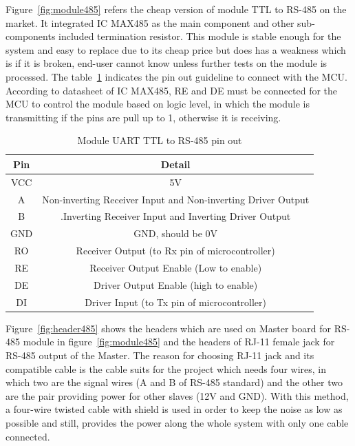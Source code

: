       Figure~\ref{fig:module485} refers the cheap version of module TTL to RS-485 on the market. It integrated IC MAX485 as the main component and other sub-components included termination resistor. This module is stable enough for the system and easy to replace due to its cheap price but does has a weakness which is if it is broken, end-user cannot know unless further tests on the module is processed. The table~\ref{table:module485PinOut} indicates the pin out guideline to connect with the MCU. According to datasheet of IC MAX485, RE and DE must be connected for the MCU to control the module based on logic level, in which the module is transmitting if the pins are pull up to 1, otherwise it is receiving.
      \begin{table}[h!]
        \begin{center}
        \begin{tabular}{ |c|c|  }
          \hline
          Pin & Detail\\
          \hline
          VCC& 5V\\
          \hline
          A&   Non-inverting Receiver Input and Non-inverting Driver Output\\
          \hline
          B &.Inverting Receiver Input and Inverting Driver Output\\
          \hline
          GND & GND, should be 0V\\
          \hline
          RO & Receiver Output (to Rx pin of microcontroller)\\
          \hline
          RE & Receiver Output Enable (Low to enable)\\
          \hline
          DE & Driver Output Enable (high to enable)\\
          \hline
          DI & Driver Input (to Tx pin of microcontroller)\\
          \hline
         \end{tabular}
         \caption{Module UART TTL to RS-485 pin out}
         \label{table:module485PinOut}
        \end{center}
        \end{table}
      
      Figure~\ref{fig:header485} shows the headers which are used on Master board for RS-485 module in figure~\ref{fig:module485} and the headers of RJ-11 female jack for RS-485 output of the Master. The reason for choosing RJ-11 jack and its compatible cable is the cable suits for the project which needs four wires, in which two are the signal wires (A and B of RS-485 standard) and the other two are the pair providing power for other slaves (12V and GND). With this method, a four-wire twisted cable with shield is used in order to keep the noise as low as possible and still, provides the power along the whole system with only one cable connected.

